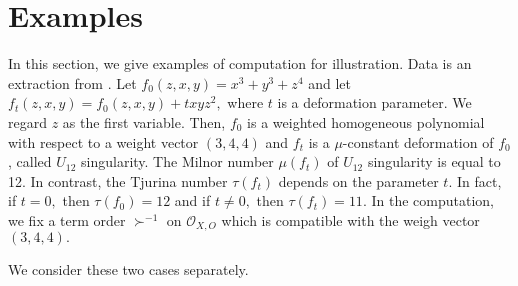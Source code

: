 \documentclass[pdftex]{arxsigma}
\begin{document}
\section{Examples}

In this section, we give  examples of computation for illustration. Data is an  extraction from \cite{TN20}.  Let $ f_0(z,x,y)=x^3+y^3+z^4 $ and let $ f_t(z,x,y)=f_0(z,x,y)+txyz^2, $
where $ t $ is a deformation parameter. We regard $ z $ as the first variable. Then, $ f_0$ is a weighted homogeneous polynomial with respect to a weight 
vector $ (3,4,4) $ and $ f_t $ is a $ \mu $-constant deformation of $ f_0 $, called $ U_{12} $ singularity. The Milnor number 
$ \mu(f_t) $ of $ U_{12} $ singularity is equal to 12. In contrast, the Tjurina number 
$ \tau(f_t) $ depends on the parameter $ t. $ In fact, 
if $ t=0,$ then $\tau(f_0) = 12 $ and if $ t \ne 0, $ then $ \tau(f_t) =11. $ In the computation, we fix a term order $ \succ^{-1} $ on $ {\mathcal O}_{X,O} $
which is compatible with the weigh vector $(3,4,4). $

We consider these two cases separately.
\end{document}
